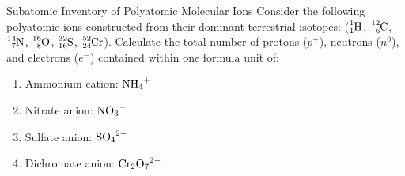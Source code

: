 \begin{exercise}{Subatomic Inventory of Polyatomic Molecular Ions}
Consider the following polyatomic ions constructed from their dominant terrestrial isotopes:
($\ce{^{1}_{1}H}$, $\ce{^{12}_{6}C}$, $\ce{^{14}_{7}N}$, $\ce{^{16}_{8}O}$, $\ce{^{32}_{16}S}$, $\ce{^{52}_{24}Cr}$).
Calculate the total number of protons ($p^+$), neutrons ($n^0$), and electrons ($e^-$) contained within one formula unit of:
\begin{enumerate}[leftmargin=1.5em,itemsep=2pt]
  \item Ammonium cation: $\ce{NH4+}$
  \item Nitrate anion: $\ce{NO3-}$
  \item Sulfate anion: $\ce{SO4^{2-}}$
  \item Dichromate anion: $\ce{Cr2O7^{2-}}$
\end{enumerate}
\end{exercise}

\begin{tabletworkspace}[5.0cm]
\end{tabletworkspace}

